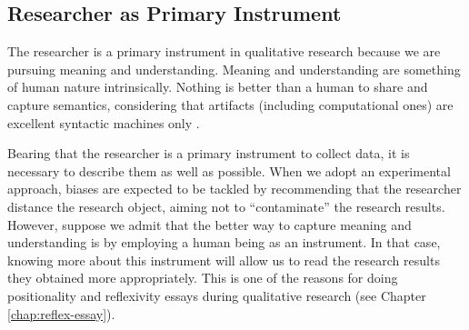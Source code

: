 \subsection{Researcher as Primary Instrument}
\label{res-met-ss:primary-instrument}

The researcher is a primary instrument in qualitative research because we are pursuing meaning and understanding. Meaning and understanding are something of human nature intrinsically. Nothing is better than a human to share and capture semantics, considering that artifacts (including computational ones) are excellent syntactic machines only \cite{setzer:2005}.

Bearing that the researcher is a primary instrument to collect data, it is necessary to describe them as well as possible. When we adopt an experimental approach, biases are expected to be tackled by recommending that the researcher distance the research object, aiming not to “contaminate” the research results. However, suppose we admit that the better way to capture meaning and understanding is by employing a human being as an instrument. In that case, knowing more about this instrument will allow us to read the research results they obtained more appropriately. This is one of the reasons for doing positionality and reflexivity essays during qualitative research (see Chapter \ref{chap:reflex-essay}).


                

        

        
